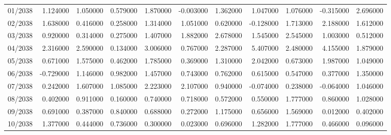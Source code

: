 \begin{tabular}{lrrrrrrrrrr}
01/2038 & 1.124000 & 1.050000 & 0.579000 & 1.870000 & -0.003000 & 1.362000 & 1.047000 & 1.076000 & -0.315000 & 2.696000 \\
02/2038 & 1.638000 & 0.416000 & 0.258000 & 1.314000 & 1.051000 & 0.620000 & -0.128000 & 1.713000 & 2.188000 & 1.612000 \\
03/2038 & 0.920000 & 0.314000 & 0.275000 & 1.407000 & 1.882000 & 2.678000 & 1.545000 & 2.545000 & 1.003000 & 0.512000 \\
04/2038 & 2.316000 & 2.590000 & 0.134000 & 3.006000 & 0.767000 & 2.287000 & 5.407000 & 2.480000 & 4.155000 & 1.879000 \\
05/2038 & 0.671000 & 1.575000 & 0.462000 & 1.785000 & 0.369000 & 1.310000 & 2.042000 & 0.673000 & 1.987000 & 1.049000 \\
06/2038 & -0.729000 & 1.146000 & 0.982000 & 1.457000 & 0.743000 & 0.762000 & 0.615000 & 0.547000 & 0.377000 & 1.350000 \\
07/2038 & 0.242000 & 1.607000 & 1.085000 & 2.223000 & 2.107000 & 0.940000 & -0.074000 & 0.238000 & -0.064000 & 1.046000 \\
08/2038 & 0.402000 & 0.911000 & 0.160000 & 0.740000 & 0.718000 & 0.572000 & 0.550000 & 1.777000 & 0.860000 & 1.028000 \\
09/2038 & 0.691000 & 0.387000 & 0.840000 & 0.688000 & 0.272000 & 1.175000 & 0.656000 & 1.569000 & 0.012000 & 0.402000 \\
10/2038 & 1.377000 & 0.444000 & 0.736000 & 0.300000 & 0.023000 & 0.696000 & 1.282000 & 1.777000 & 0.466000 & 0.096000 \\
\bottomrule
\end{tabular}
